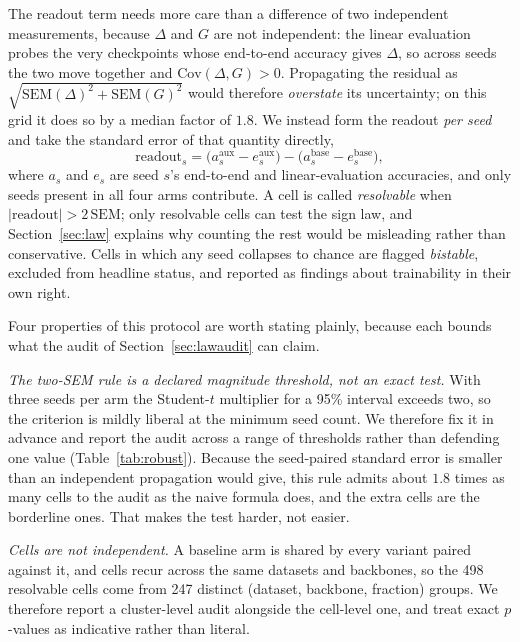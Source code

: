 The readout term needs more care than a difference of two independent
measurements, because $\Delta$ and $G$ are not independent: the linear
evaluation probes the very checkpoints whose end-to-end accuracy gives
$\Delta$, so across seeds the two move together and
$\mathrm{Cov}(\Delta, G) > 0$. Propagating the residual as
$\sqrt{\mathrm{SEM}(\Delta)^2 + \mathrm{SEM}(G)^2}$ would therefore
\emph{overstate} its uncertainty; on this grid it does so by a median
factor of $1.8$. We instead form the readout \emph{per seed} and take the
standard error of that quantity directly,
\begin{equation}
  \mathrm{readout}_s =
  \bigl(a^{\mathrm{aux}}_s - e^{\mathrm{aux}}_s\bigr) -
  \bigl(a^{\mathrm{base}}_s - e^{\mathrm{base}}_s\bigr),
  \label{eq:sem}
\end{equation}
where $a_s$ and $e_s$ are seed $s$'s end-to-end and linear-evaluation
accuracies, and only seeds present in all four arms contribute. A cell is called
\emph{resolvable} when $|\mathrm{readout}| > 2\,\mathrm{SEM}$; only
resolvable cells can test the sign law, and Section~\ref{sec:law}
explains why counting the rest would be misleading rather than
conservative. Cells in which any seed collapses to chance are flagged
\emph{bistable}, excluded from headline status, and reported as findings
about trainability in their own right.

Four properties of this protocol are worth stating plainly, because each
bounds what the audit of Section~\ref{sec:lawaudit} can claim.

\emph{The two-SEM rule is a declared magnitude threshold, not an exact
test.} With three seeds per arm the Student-$t$ multiplier for a 95\%
interval exceeds two, so the criterion is mildly liberal at the minimum
seed count. We therefore fix it in advance and report the audit across a
range of thresholds rather than defending one value
(Table~\ref{tab:robust}). Because the seed-paired standard error is
smaller than an independent propagation would give, this rule admits about
$1.8$ times as many cells to the audit as the naive formula does, and the
extra cells are the borderline ones. That makes the test harder, not
easier.

\emph{Cells are not independent.} A baseline arm is shared by every
variant paired against it, and cells recur across the same datasets and
backbones, so the 498 resolvable cells come from 247 distinct
(dataset, backbone, fraction) groups. We
therefore report a cluster-level audit alongside the cell-level one, and
treat exact $p$-values as indicative rather than literal.

